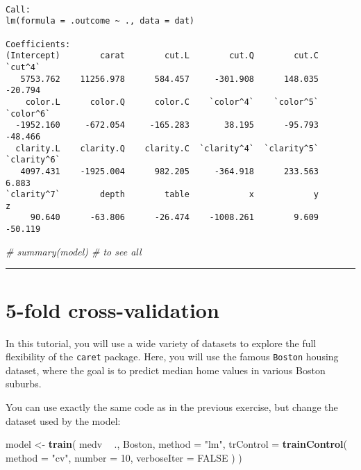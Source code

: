 \documentclass[]{book}
\newenvironment{Shaded}{\begin{snugshade}}{\end{snugshade}}
\newcommand{\KeywordTok}[1]{\textcolor[rgb]{0.13,0.29,0.53}{\textbf{#1}}}
\newcommand{\DataTypeTok}[1]{\textcolor[rgb]{0.13,0.29,0.53}{#1}}
\newcommand{\DecValTok}[1]{\textcolor[rgb]{0.00,0.00,0.81}{#1}}
\newcommand{\StringTok}[1]{\textcolor[rgb]{0.31,0.60,0.02}{#1}}
\newcommand{\CommentTok}[1]{\textcolor[rgb]{0.56,0.35,0.01}{\textit{#1}}}
\newcommand{\OtherTok}[1]{\textcolor[rgb]{0.56,0.35,0.01}{#1}}
\newcommand{\OperatorTok}[1]{\textcolor[rgb]{0.81,0.36,0.00}{\textbf{#1}}}
\newcommand{\NormalTok}[1]{#1}
\begin{document}
\begin{verbatim}

Call:
lm(formula = .outcome ~ ., data = dat)

Coefficients:
(Intercept)        carat        cut.L        cut.Q        cut.C      `cut^4`  
   5753.762    11256.978      584.457     -301.908      148.035      -20.794  
    color.L      color.Q      color.C    `color^4`    `color^5`    `color^6`  
  -1952.160     -672.054     -165.283       38.195      -95.793      -48.466  
  clarity.L    clarity.Q    clarity.C  `clarity^4`  `clarity^5`  `clarity^6`  
   4097.431    -1925.004      982.205     -364.918      233.563        6.883  
`clarity^7`        depth        table            x            y            z  
     90.640      -63.806      -26.474    -1008.261        9.609      -50.119  
\end{verbatim}

\begin{Shaded}
\begin{Highlighting}[]
\CommentTok{# summary(model)  # to see all}
\end{Highlighting}
\end{Shaded}

\begin{center}\rule{0.5\linewidth}{\linethickness}\end{center}

\section{5-fold cross-validation}\label{fold-cross-validation-1}

In this tutorial, you will use a wide variety of datasets to explore the
full flexibility of the \texttt{caret} package. Here, you will use the
famous \texttt{Boston} housing dataset, where the goal is to predict
median home values in various Boston suburbs.

You can use exactly the same code as in the previous exercise, but
change the dataset used by the model:

\begin{Shaded}
\begin{Highlighting}[]
\NormalTok{model <-}\StringTok{ }\KeywordTok{train}\NormalTok{(}
\NormalTok{  medv }\OperatorTok{~}\StringTok{ }\NormalTok{., Boston,}
  \DataTypeTok{method =} \StringTok{"lm"}\NormalTok{,}
  \DataTypeTok{trControl =} \KeywordTok{trainControl}\NormalTok{(}
    \DataTypeTok{method =} \StringTok{"cv"}\NormalTok{, }\DataTypeTok{number =} \DecValTok{10}\NormalTok{,}
    \DataTypeTok{verboseIter =} \OtherTok{FALSE}
\NormalTok{  )}
\NormalTok{)}
\end{Highlighting}
\end{Shaded}
\end{document}
